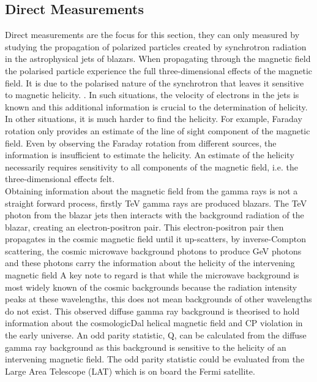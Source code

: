 \subsection {Direct Measurements}
Direct measurements are the focus for this section, they can only measured by studying the propagation of polarized particles created by synchrotron radiation in the astrophysical jets of blazars. When propagating through the magnetic field the polarised particle experience the full three-dimensional effects of the magnetic field. It is due to the polarised nature of the synchrotron that leaves it sensitive to magnetic helicity. \cite{2} \cite{9}.
In such situations, the velocity of electrons in the jets is known and this additional information is crucial to the determination of helicity. In other situations, it is much harder to find the helicity. For example, Faraday rotation only provides an estimate of the line of sight component of the magnetic field. Even by observing the Faraday rotation from different sources, the information is insufficient to estimate the helicity. An estimate of the helicity necessarily requires sensitivity to all components of the magnetic field, i.e. the three-dimensional effects felt. \cite{15} \\
Obtaining information about the magnetic field from the gamma rays is not a straight forward process, firstly TeV gamma rays are produced blazars. The TeV photon from the blazar jets then interacts with the background radiation of the blazar, creating an electron-positron pair. This electron-positron pair then propagates in the cosmic magnetic field until it up-scatters, by inverse-Compton scattering, the cosmic microwave background photons to produce GeV photons and these photons carry the information about the helicity of the intervening magnetic field \cite{9} A key note to regard is that while the microwave background is most widely known of the cosmic backgrounds because the radiation intensity peaks at these wavelengths, this does not mean backgrounds of other wavelengths do not exist. This observed diffuse gamma ray background is theorised to hold information about the cosmologicDal helical magnetic field and CP violation in the early universe. \cite{10} An odd parity statistic, Q, can be calculated from the diffuse gamma ray background as this background is sensitive to the helicity of an intervening magnetic field. The odd parity statistic could be evaluated from the Large Area Telescope (LAT) which is on board the Fermi satellite.\cite{2} 


